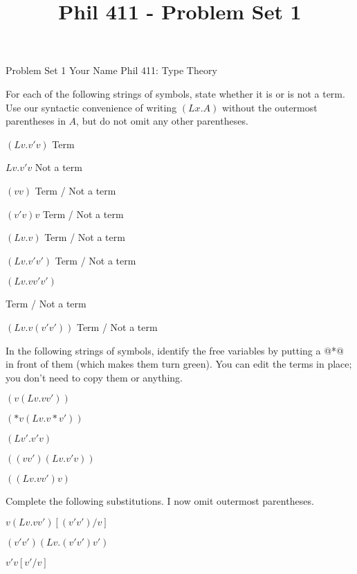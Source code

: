 
\title{Phil 411 - Problem Set 1}

\heading
Problem Set 1
Your Name
Phil 411: Type Theory
\endheading

For each of the following strings of symbols, state whether it is or is not a term. Use our syntactic convenience of writing $(Lx.A)$ without the outermost parentheses in $A$, but do not omit any other parentheses.

\problems
{}
$ (Lv.v'v) $
        \answer
        Term
        \endanswer

\problem{\gobble}
$ Lv.v'v $
        \answer
        Not a term
        \endanswer

$ (vv) $
        \answer
        Term / Not a term
        \endanswer

$ (v'v)v $
        \answer
        Term / Not a term
        \endanswer

$ (Lv.v) $
        \answer
        Term / Not a term
        \endanswer

$ (Lv.v'v') $
        \answer
        Term / Not a term
        \endanswer

$ (Lv.vv'v') $

        \answer
        Term / Not a term
        \endanswer

$ (Lv.v(v'v')) $
        \answer
        Term / Not a term
        \endanswer

\endproblems

In the following strings of symbols, identify the free variables by putting a @*@ in front of them (which makes them turn green). You can edit the terms in place; you don't need to copy them or anything.

\problems
{}
$ (v(Lv.vv')) $

\negskip
{}
$ (*v(Lv.v*v')) $

$ (Lv'.v'v) $

$ ((vv')(Lv.v'v)) $

$ ((Lv.vv')v) $

\endproblems

Complete the following substitutions. I now omit outermost parentheses.

\problems
{}
$ v(Lv.vv')[(v'v')/v] $

	\answer
	$ (v'v')(Lv.(v'v')v') $
	\endanswer

$ v'v[v'/v] $

